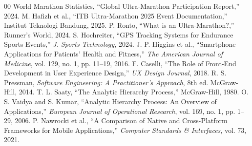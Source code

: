 \documentclass[conference]{IEEEtran}
\begin{document}
\begin{thebibliography}{00}
 World Marathon Statistics, ``Global Ultra-Marathon Participation Report,'' 2024.
 M. Hafizh et al., ``ITB Ultra-Marathon 2025 Event Documentation,'' Institut Teknologi Bandung, 2025.
 P. Ronto, ``What is an Ultra-Marathon?,'' Runner's World, 2024.
 S. Hochreiter, ``GPS Tracking Systems for Endurance Sports Events,'' \textit{J. Sports Technology}, 2024.
 J. P. Higgins et al., ``Smartphone Applications for Patients' Health and Fitness,'' \textit{The American Journal of Medicine}, vol. 129, no. 1, pp. 11--19, 2016.
 F. Caselli, ``The Role of Front-End Development in User Experience Design,'' \textit{UX Design Journal}, 2018.
 R. S. Pressman, \textit{Software Engineering: A Practitioner's Approach}, 8th ed. McGraw-Hill, 2014.
 T. L. Saaty, ``The Analytic Hierarchy Process,'' McGraw-Hill, 1980.
 O. S. Vaidya and S. Kumar, ``Analytic Hierarchy Process: An Overview of Applications,'' \textit{European Journal of Operational Research}, vol. 169, no. 1, pp. 1--29, 2006.
 P. Nawrocki et al., ``A Comparison of Native and Cross-Platform Frameworks for Mobile Applications,'' \textit{Computer Standards \& Interfaces}, vol. 73, 2021.
\end{thebibliography}
\end{document}
